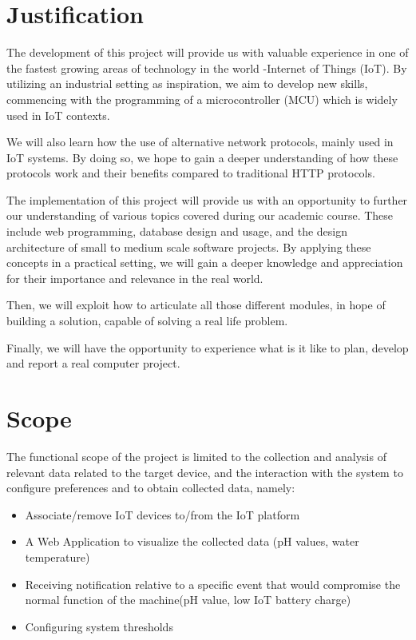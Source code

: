 \documentclass[a4paper,twoside,11pt]{article}
\begin{document}
\section{Justification}

The development of this project will provide us with valuable experience in one of the fastest growing areas of technology in the world -Internet of Things (IoT).
By utilizing an industrial setting as inspiration, we aim to develop new skills, commencing with the programming of a microcontroller (MCU) which is widely used in IoT contexts.

We will also learn how the use of alternative network protocols, mainly used in IoT systems. By doing so, we hope to gain a deeper understanding of how these protocols work and their benefits compared to traditional HTTP protocols.

The implementation of this project will provide us with an opportunity to further our understanding of various topics covered during our academic course. These include web programming, database design and usage, and the design architecture of small to medium scale software projects. By applying these concepts in a practical setting, we will gain a deeper knowledge and appreciation for their importance and relevance in the real world. 

Then, we will exploit how to articulate all those different modules, in hope of building a solution, capable of solving a real life problem.

Finally, we will have the opportunity to experience what is it like to plan, develop and report a real computer project.

\section{Scope}
The functional scope of the project is limited to the collection and analysis of relevant data related to the target device, and the interaction with the system to configure preferences and to obtain collected data, namely:
\begin{itemize}
    \item Associate/remove IoT devices to/from the IoT platform
    \item A Web Application to visualize the collected data (pH values, water temperature)
    \item Receiving notification relative to a specific event that would compromise the normal function of the machine(pH value, low IoT battery charge)
    \item Configuring system thresholds
\end{itemize}
\end{document}
